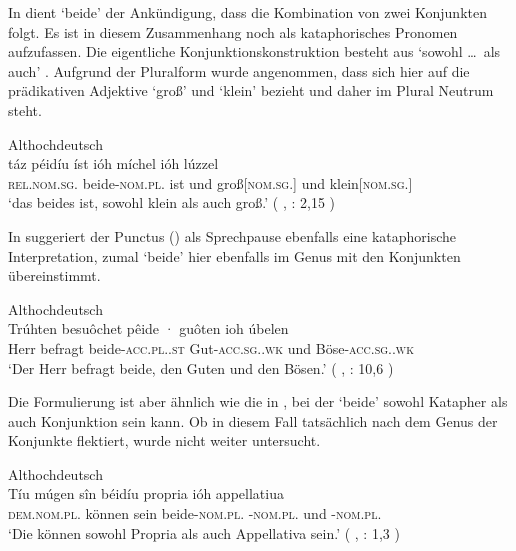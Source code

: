 
In  dient  `beide' der Ankündigung, dass die
Kombination von zwei Konjunkten folgt. Es ist in diesem Zusammenhang noch als
kataphorisches Pronomen aufzufassen. Die eigentliche Konjunktionskonstruktion
besteht aus  `sowohl \dots\ als auch'
\autocite[vgl.][169]{schuetzeichel2012}. Aufgrund der Pluralform wurde
angenommen, dass  sich hier auf die prädikativen Adjektive
 `groß' und 
`klein' bezieht und daher im Plural Neutrum steht.

\begin{exe}
\ex \label{ex:beidejohahd_1}
	\langinfo%
		{Althochdeutsch}%
		{}%
		{\cite[57]{king1972}}\\
\gll táz péidíu íst ióh míchel ióh lúzzel \\
	\textsc{rel.nom.sg.\NeutI} beide-\textsc{nom.pl.\NeutI} ist und
	groß[\textsc{nom.sg.\NeutI}] und klein[\textsc{nom.sg.\NeutI}] \\
\trans `das beides ist, sowohl klein als auch groß.'
	(%
		, : 2,15%
	)
\end{exe}

In 
suggeriert der Punctus () als Sprechpause ebenfalls eine kataphorische
Interpretation, zumal  `beide' hier ebenfalls im Genus mit den
Konjunkten übereinstimmt.

\begin{exe}
\ex \label{ex:beidejohahd_2}
	\langinfo%
		{Althochdeutsch}%
		{}%
		{\cite[35]{tax1979}}\\
	\gll Trúhten besuôchet pêide · guôten ioh úbelen \\
		Herr befragt beide-\textsc{acc.pl.\MascA.st} {}
			Gut-\textsc{acc.sg.\MascA.wk} und
			Böse-\textsc{acc.sg.\MascA.wk} \\
	\trans `Der Herr befragt beide, den Guten und den Bösen.'
		(%
			, : 10,6%
		)
\end{exe}

Die Formulierung ist aber ähnlich wie die in , bei der
 `beide' sowohl Katapher als auch Konjunktion sein kann. Ob
 in diesem Fall tatsächlich nach dem Genus der Konjunkte flektiert,
wurde nicht weiter untersucht.

\begin{exe}
\ex \label{ex:beidejohahd_3}
	\langinfo%
		{Althochdeutsch}%
		{}%
		{\cite[6]{king1972}}\\
	\gll Tíu múgen sîn béidíu propria ióh appellatiua \\
		\textsc{dem.nom.pl.\NeutI} können sein beide-\textsc{nom.pl.\NeutI}
			-\textsc{nom.pl.\NeutI} und
			-\textsc{nom.pl.\NeutI} \\
	\trans `Die können sowohl Propria als auch Appellativa sein.'
		(%
			, : 1,3%
		)
\end{exe}

